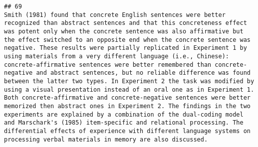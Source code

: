 \documentclass[
  english,
  man]{apa6}
\begin{document}
\begin{verbatim}
## 69                                                                                                                                                                                                                                                                                                                                                                                                                                                                                                                                                                                                                                                                                                                                                                                                                                                                                                                                                                                                                                                                                                                                                                                                                                                                                                                                                                                                                                                                                                                                            Smith (1981) found that concrete English sentences were better recognized than abstract sentences and that this concreteness effect was potent only when the concrete sentence was also affirmative but the effect switched to an opposite end when the concrete sentence was negative. These results were partially replicated in Experiment 1 by using materials from a very different language (i.e., Chinese): concrete-affirmative sentences were better remembered than concrete-negative and abstract sentences, but no reliable difference was found between the latter two types. In Experiment 2 the task was modified by using a visual presentation instead of an oral one as in Experiment 1. Both concrete-affirmative and concrete-negative sentences were better memorized then abstract ones in Experiment 2. The findings in the two experiments are explained by a combination of the dual-coding model and Marschark's (1985) item-specific and relational processing. The differential effects of experience with different language systems on processing verbal materials in memory are also discussed.

\end{verbatim}
\end{document}
